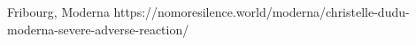           {Fribourg, }
          {}
          {Moderna}
          {}
          {
          }
          {https://nomoresilence.world/moderna/christelle-dudu-moderna-severe-adverse-reaction/}


